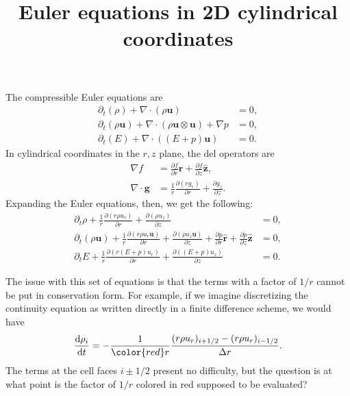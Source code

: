 \documentclass{article}
\title{Euler equations in 2D cylindrical coordinates}
\begin{document}
\maketitle

The compressible Euler equations are
\begin{align}
    \partial_t (\rho) + \nabla \cdot (\rho \bm{u}) &= 0, \\
    \partial_t (\rho \bm{u}) + \nabla \cdot (\rho \bm{u} \otimes \bm{u}) + \nabla p &= 0, \\
    \partial_t (E) + \nabla \cdot ((E + p) \bm{u}) &= 0.
\end{align}
In cylindrical coordinates in the $r, z$ plane, the del operators are
\begin{align*}
    \nabla f &= \frac{\partial f}{\partial r} \hat{\bm{r}} + \frac{\partial f}{\partial z} \hat{\bm{z}}, \\
    \nabla \cdot \bm{g} &= \frac{1}{r} \frac{\partial (r g_r)}{\partial r} + \frac{\partial g_z}{\partial z}.
\end{align*}
Expanding the Euler equations, then, we get the following:
\begin{align*}
    \partial_t \rho + \frac{1}{r} \frac{\partial (r \rho u_r)}{\partial r} + \frac{\partial (\rho u_z)}{\partial z} &= 0, \\
    \partial_t (\rho \bm{u}) + \frac{1}{r} \frac{\partial (r \rho u_r \bm{u})}{\partial r} + \frac{\partial (\rho u_z \bm{u})}{\partial z} + \frac{\partial p}{\partial r} \hat{\bm{r}} + \frac{\partial p}{\partial z} \hat{\bm{z}} &= 0, \\
    \partial_t E + \frac{1}{r} \frac{\partial (r(E + p) u_r)}{\partial r} + \frac{\partial ((E + p) u_z)}{\partial z} &= 0.
\end{align*}

The issue with this set of equations is that the terms with a factor of $1/r$ cannot be put in conservation form.
For example, if we imagine discretizing the continuity equation as written directly in a finite difference scheme,
we would have
\begin{align*}
    \frac{\mathrm{d} \rho_i}{\mathrm{d} t} = -\frac{1}{{\color{red} r}} \frac{(r \rho u_r)_{i+1/2} - (r \rho u_r)_{i-1/2}}{\Delta r}.
\end{align*}
The terms at the cell faces $i\pm1/2$ present no difficulty, but the question is at what point is the factor of $1/r$ colored in red supposed to be evaluated?
\end{document}
